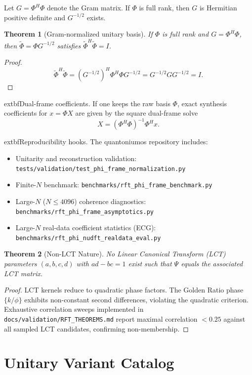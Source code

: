 \documentclass[11pt,a4paper]{article}
\newtheorem{theorem}{Theorem}
\begin{document}
Let $G=\Phi^H\Phi$ denote the Gram matrix. If $\Phi$ is full rank, then $G$ is Hermitian positive definite and $G^{-1/2}$ exists.

\begin{theorem}[Gram-normalized unitary basis]
If $\Phi$ is full rank and $G=\Phi^H\Phi$, then $\widetilde{\Phi}=\Phi G^{-1/2}$ satisfies $\widetilde{\Phi}^H\widetilde{\Phi}=I$.
\end{theorem}

\begin{proof}
\[
\widetilde{\Phi}^H\widetilde{\Phi}=(G^{-1/2})^H\Phi^H\Phi G^{-1/2}=G^{-1/2}GG^{-1/2}=I.
\]
\end{proof}

	extbf{Dual-frame coefficients.} If one keeps the raw basis $\Phi$, exact synthesis coefficients for $x=\Phi X$ are given by the square dual-frame solve
\[
X=(\Phi^H\Phi)^{-1}\Phi^H x.
\]

	extbf{Reproducibility hooks.} The quantoniumos repository includes:
\begin{itemize}
    \item Unitarity and reconstruction validation: \texttt{tests/validation/test\_phi\_frame\_normalization.py}
    \item Finite-$N$ benchmark: \texttt{benchmarks/rft\_phi\_frame\_benchmark.py}
    \item Large-$N$ ($N\le 4096$) coherence diagnostics: \texttt{benchmarks/rft\_phi\_frame\_asymptotics.py}
    \item Large-$N$ real-data coefficient statistics (ECG): \texttt{benchmarks/rft\_phi\_nudft\_realdata\_eval.py}
\end{itemize}

\begin{theorem}[Non-LCT Nature]
No Linear Canonical Transform (LCT) parameters $(a,b,c,d)$ with $ad-bc=1$ exist such that $\Psi$ equals the associated LCT matrix.
\end{theorem}

\begin{proof}
LCT kernels reduce to quadratic phase factors. The Golden Ratio phase $\{k/\phi\}$ exhibits non-constant second differences, violating the quadratic criterion. Exhaustive correlation sweeps implemented in \texttt{docs/validation/RFT\_THEOREMS.md} report maximal correlation $<0.25$ against all sampled LCT candidates, confirming non-membership.
\end{proof}

\section{Unitary Variant Catalog}
\end{document}
